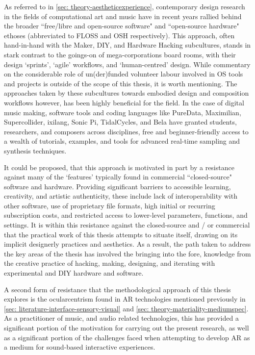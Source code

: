 As referred to in \autoref{sec: theory-aestheticexperience}, contemporary design research in the fields of computational art and music have in recent years rallied behind the broader ``free/libre and open-source software" and ``open-source hardware" ethoses (abbreviated to FLOSS and OSH respectively). This approach, often hand-in-hand with the Maker, DIY, and Hardware Hacking subcultures, stands in stark contrast to the goings-on of mega-corporations board rooms, with their design `sprints', `agile' workflows, and `human-centred' design. While commentary on the considerable role of un(der)funded volunteer labour involved in OS tools and projects is outside of the scope of this thesis, it is worth mentioning. The approaches taken by these subcultures towards embodied design and composition workflows however, has been highly beneficial for the field. In the case of digital music making, software tools and coding languages like PureData, Maximilian, Supercollider, ixilang, Sonic Pi, TidalCycles, and Bela have granted students, researchers, and composers across disciplines, free and beginner-friendly access to a wealth of tutorials, examples, and tools for advanced real-time sampling and synthesis techniques.

It could be proposed, that this approach is motivated in part by a resistance against many of the `features' typically found in commercial ``closed-source" software and hardware. Providing significant barriers to accessible learning, creativity, and artistic authenticity, these include lack of interoperability with other software, use of proprietary file formats, high initial or recurring subscription costs, and restricted access to lower-level parameters, functions, and settings. It is within this resistance against the closed-source and / or commercial that the practical work of this thesis attempts to situate itself, drawing on its implicit designerly practices and aesthetics. As a result, the path taken to address the key areas of the thesis has involved the bringing into the fore, knowledge from the creative practice of hacking, making, designing, and iterating with experimental and DIY hardware and software.

A second form of resistance that the methodological approach of this thesis explores is the ocularcentrism found in AR technologies mentioned previously in \autoref{sec: literature-interface-sensory-visual} and \autoref{sec: theory-materiality-mediumspec}. As a practitioner of music, and audio related technologies, this has provided a significant portion of the motivation for carrying out the present research, as well as a significant portion of the challenges faced when attempting to develop AR as a medium for sound-based interactive experiences.

